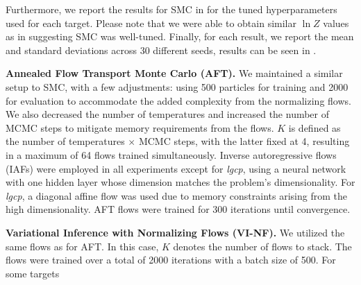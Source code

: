 Furthermore, we report the results for SMC in  for the tuned hyperparameters used for each target. Please note that we were able to obtain similar $\ln Z$ values as in \textcite{vargas2023denoising} suggesting SMC was well-tuned. Finally, for each result, we report the mean and standard deviations across 30 different seeds, results can be seen in .


\textbf{Annealed Flow Transport Monte Carlo (AFT).}
We maintained a similar setup to SMC, with a few adjustments: using 500 particles for training and 2000 for evaluation to accommodate the added complexity from the normalizing flows. We also decreased the number of temperatures and increased the number of MCMC steps to mitigate memory requirements from the flows. $K$ is defined as the number of temperatures $\times$ MCMC steps, with the latter fixed at 4, resulting in a maximum of 64 flows trained simultaneously. Inverse autoregressive flows (IAFs) were employed in all experiments except for \textit{lgcp}, using a neural network with one hidden layer whose dimension matches the problem's dimensionality. For \textit{lgcp}, a diagonal affine flow was used due to memory constraints arising from the high dimensionality. AFT flows were trained for 300 iterations until convergence.




\textbf{Variational Inference with Normalizing Flows (VI-NF).}
We utilized the same flows as for AFT. In this case, $K$ denotes the number of flows to stack. The flows were trained over a total of 2000 iterations with a batch size of 500. For some targets

\begin{table}[htb!]
\caption[Tuned MCMC Step Sizes]{\textbf{Tuned MCMC Step Sizes.}}
\label{table:mdn_hp}
\begin{center}
\begin{small}
\begin{sc}
\end{sc}
\end{small}
\end{center}
\vskip -0.1in
\end{table}

